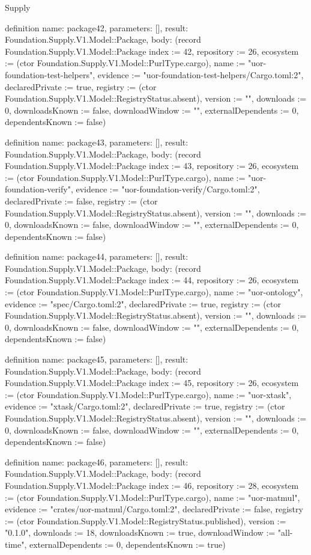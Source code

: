 \begin{lexlean}{Supply}
\begin{semanticmodule}
definition{
  name: package42,
  parameters: [],
  result: Foundation.Supply.V1.Model::Package,
  body: (record Foundation.Supply.V1.Model::Package {index := 42, repository := 26, ecosystem := (ctor Foundation.Supply.V1.Model::PurlType.cargo), name := "uor-foundation-test-helpers", evidence := "uor-foundation-test-helpers/Cargo.toml:2", declaredPrivate := true, registry := (ctor Foundation.Supply.V1.Model::RegistryStatus.absent), version := "", downloads := 0, downloadsKnown := false, downloadWindow := "", externalDependents := 0, dependentsKnown := false})
}

definition{
  name: package43,
  parameters: [],
  result: Foundation.Supply.V1.Model::Package,
  body: (record Foundation.Supply.V1.Model::Package {index := 43, repository := 26, ecosystem := (ctor Foundation.Supply.V1.Model::PurlType.cargo), name := "uor-foundation-verify", evidence := "uor-foundation-verify/Cargo.toml:2", declaredPrivate := false, registry := (ctor Foundation.Supply.V1.Model::RegistryStatus.absent), version := "", downloads := 0, downloadsKnown := false, downloadWindow := "", externalDependents := 0, dependentsKnown := false})
}

definition{
  name: package44,
  parameters: [],
  result: Foundation.Supply.V1.Model::Package,
  body: (record Foundation.Supply.V1.Model::Package {index := 44, repository := 26, ecosystem := (ctor Foundation.Supply.V1.Model::PurlType.cargo), name := "uor-ontology", evidence := "spec/Cargo.toml:2", declaredPrivate := true, registry := (ctor Foundation.Supply.V1.Model::RegistryStatus.absent), version := "", downloads := 0, downloadsKnown := false, downloadWindow := "", externalDependents := 0, dependentsKnown := false})
}

definition{
  name: package45,
  parameters: [],
  result: Foundation.Supply.V1.Model::Package,
  body: (record Foundation.Supply.V1.Model::Package {index := 45, repository := 26, ecosystem := (ctor Foundation.Supply.V1.Model::PurlType.cargo), name := "uor-xtask", evidence := "xtask/Cargo.toml:2", declaredPrivate := true, registry := (ctor Foundation.Supply.V1.Model::RegistryStatus.absent), version := "", downloads := 0, downloadsKnown := false, downloadWindow := "", externalDependents := 0, dependentsKnown := false})
}

definition{
  name: package46,
  parameters: [],
  result: Foundation.Supply.V1.Model::Package,
  body: (record Foundation.Supply.V1.Model::Package {index := 46, repository := 28, ecosystem := (ctor Foundation.Supply.V1.Model::PurlType.cargo), name := "uor-matmul", evidence := "crates/uor-matmul/Cargo.toml:2", declaredPrivate := false, registry := (ctor Foundation.Supply.V1.Model::RegistryStatus.published), version := "0.1.0", downloads := 18, downloadsKnown := true, downloadWindow := "all-time", externalDependents := 0, dependentsKnown := true})
}


\end{semanticmodule}
\end{lexlean}
